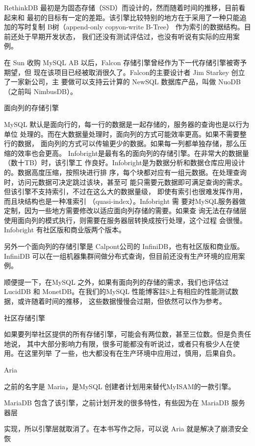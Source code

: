RethinkDB 最初是为固态存储（SSD）而设计的，然而随着时间的推移，目前看起来和
最初的目标有一定的差距。该引擎比较特别的地方在于采用了一种只能追加的写时复制
B树（append-only copyon-write B-Tree） 作为索引的数据结构。目前还处于早期开发状态，
我们还没有测试评估过，也没有听说有实际的应用案例。

在 Sun 收购 MySQL AB 以后，Falcon 存储引擎曾经作为下一代存储引擎被寄予期望，但
现在该项目已经被取消很久了。Falcon的主要设计者 Jim Starkey 创立了一家新公司，主
要做可以支持云计算的 NewSQL 数据库产品，叫做 NuoDB（之前叫 NimbusDB）。

面向列的存储引擎

MySQL 默认是面向行的，每一行的数据是一起存储的，服务器的查询也是以行为单位
处理的。而在大数据量处理时，面向列的方式可能效率更高。如果不需要整行的数据，
面向列的方式可以传输更少的数据。如果每一列都单独存储，那么压缩的效率也会更高。
Infobright是最有名的面向列的存储引擎。在非常大的数据量（数十TB）时，该引擎工
作良好。Infobright是为数据分析和数据仓库应用设计的。数据高度压缩，按照块进行排
序，每个块都对应有一组元数据。在处理查询时，访问元数据可决定跳过该块，甚至可
能只需要元数据即可满足查询的需求。但该引擎不支持索引，不过在这么大的数据量级，
即使有索引也很难发挥作用，而且块结构也是一种准索引 （quasi-index）。Infobright 需
要对MySQL服务器做定制，因为一些地方需要修改以适应面向列存储的需要。如果查
询无法在存储层使用面向列的模式执行，则需要在服务器层转换成按行处理，这个过程
会很慢。Infobright 有社区版和商业版两个版本。

另外一个面向列的存储引擎是 Calpont公司的 InfiniDB，也有社区版和商业版。InfiniDB
可以在一组机器集群间做分布式查询，但目前还没有生产环境的应用案例。

顺便提一下，在MySQL 之外，如果有面向列的存储的需求，我们也评估过LucidDB 和
MonetDB。在我们的MySQL 性能博客註S上有相应的性能测试数据，或许随着时间的推移，
这些数据慢慢会过期，但依然可以作为参考。

社区存储引擎

如果要列举社区提供的所有存储引擎，可能会有两位数，甚至三位数。但是负责任地说，
其中大部分影响力有限，很多可能都没有听说过，或者只有极少人在使用。在这里列举
了一些，也大都没有在生产环境中应用过，慎用，后果自负。

Aria

之前的名字是 Maria，是MySQL 创建者计划用来替代MyISAM的一款引擎。

MariaDB 包含了该引擎，之前计划开发的很多特性，有些因为在 MariaDB 服务器层

实现，所以引擎层就取消了。在本书写作之际，可以说 Aria 就是解决了崩溃安全恢

